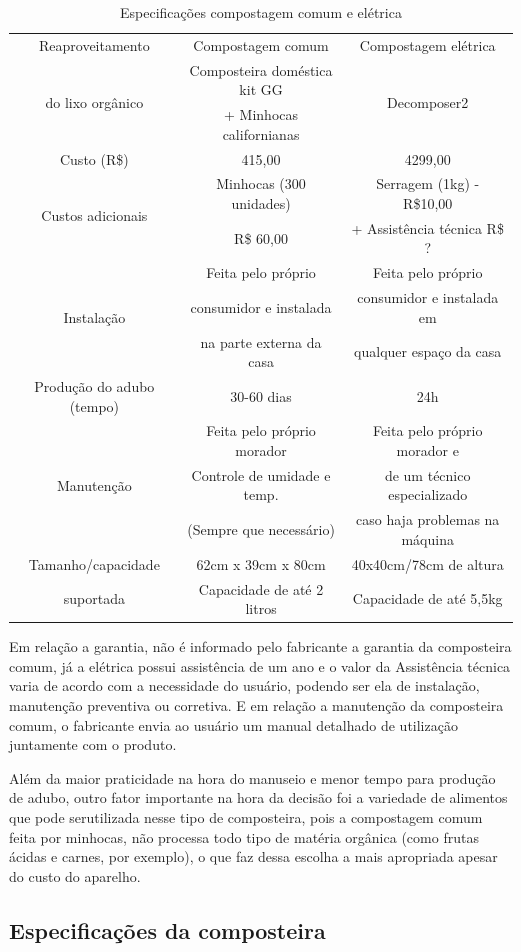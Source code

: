 \begin{table}[H]
\centering
\begin{tabular}{|c|c|c|}
\hline 
Reaproveitamento & Compostagem comum & Compostagem elétrica\tabularnewline
\multirow{2}{*}{do lixo orgânico} & Composteira doméstica kit GG & \multirow{2}{*}{Decomposer2}\tabularnewline
 & + Minhocas californianas & \tabularnewline
\hline 
Custo (R\$) & 415,00 & 4299,00\tabularnewline
\hline 
\multirow{2}{*}{Custos adicionais} & Minhocas (300 unidades) & Serragem (1kg) - R\$10,00\tabularnewline
 &  R\$ 60,00 & + Assistência técnica R\$ ?\tabularnewline
\hline 
\multirow{3}{*}{Instalação} & Feita pelo próprio & Feita pelo próprio\tabularnewline
 & consumidor e instalada & consumidor e instalada em\tabularnewline
 & na parte externa da casa & qualquer espaço da casa\tabularnewline
\hline 
Produção do adubo (tempo) & 30-60 dias & 24h\tabularnewline
\hline 
\multirow{3}{*}{Manutenção} & Feita pelo próprio morador & Feita pelo próprio morador e\tabularnewline
\cline{2-3} 
 & Controle de umidade e temp. & de um técnico especializado\tabularnewline
\cline{2-3} 
 & (Sempre que necessário) & caso haja problemas na máquina\tabularnewline
\hline 
Tamanho/capacidade & 62cm x 39cm x 80cm & 40x40cm/78cm de altura\tabularnewline
suportada & Capacidade de até 2 litros & Capacidade de até 5,5kg\tabularnewline
\hline 
\end{tabular}\caption{Especificações compostagem comum e elétrica}
\end{table}

	Em relação a garantia, não é informado pelo fabricante a garantia da composteira
comum, já a elétrica possui assistência de um ano e o valor da Assistência técnica varia de acordo
com a necessidade do usuário, podendo ser ela de instalação, manutenção preventiva ou
corretiva. E em relação a manutenção da composteira comum, o fabricante envia ao usuário um
manual detalhado de utilização juntamente com o produto.

	Além da maior praticidade na hora do manuseio e menor tempo para produção de
adubo, outro fator importante na hora da decisão foi a variedade de alimentos que pode serutilizada nesse tipo de composteira, pois a compostagem comum feita por minhocas, não
processa todo tipo de matéria orgânica (como frutas ácidas e carnes, por exemplo), o que faz
dessa escolha a mais apropriada apesar do custo do aparelho.


\subsection{Especificações da composteira}

